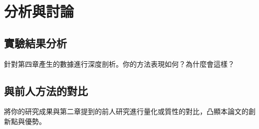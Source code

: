 \chapter{分析與討論}
\label{cha:CH5-Discussion} 

\section{實驗結果分析}
針對第四章產生的數據進行深度剖析。你的方法表現如何？為什麼會這樣？

\section{與前人方法的對比}
將你的研究成果與第二章提到的前人研究進行量化或質性的對比，凸顯本論文的創新點與優勢。